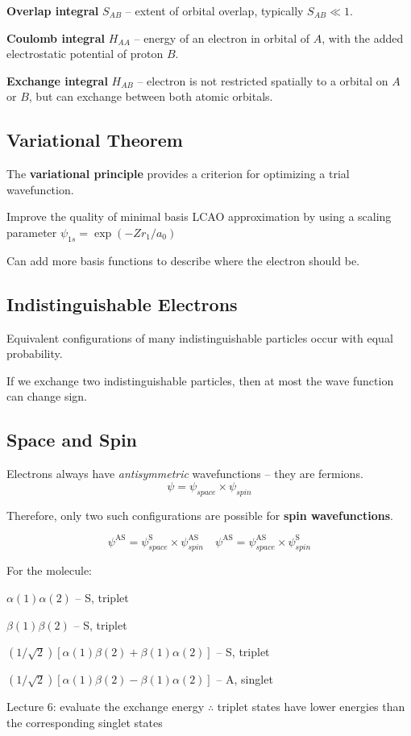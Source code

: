 \textbf{Overlap integral} $S_{AB}$ -- extent of orbital overlap, typically $S_{AB} \ll 1$.

\textbf{Coulomb integral} $H_{AA}$ -- energy of an electron in  orbital of $A$, with the added electrostatic potential of proton $B$.

\textbf{Exchange integral} $H_{AB}$ -- electron is not restricted spatially to a  orbital on $A$ or $B$,
but can exchange between both atomic orbitals.
\vspace{\baselineskip}

\subsection*{Variational Theorem}
The \textbf{variational principle} provides a criterion for optimizing a trial wavefunction.

Improve the quality of minimal basis LCAO approximation by using a scaling parameter $\psi_{1s} = \exp (-Zr_1/a_0)$

Can add more basis functions to describe where the electron should be.

\subsection*{Indistinguishable Electrons}
Equivalent configurations of many indistinguishable particles occur with equal probability.

If we exchange two indistinguishable particles, then at most the
wave function can change sign. 

\subsection*{Space and Spin}
Electrons always have \textit{antisymmetric} wavefunctions -- they are fermions.
$$\psi = \psi_{space} \times \psi_{spin}$$

Therefore, only two such configurations are possible for \textbf{spin wavefunctions}.

$$ \psi^{\mathrm{AS}} = \psi_{space}^{\mathrm{S}} \times \psi_{spin}^{\mathrm{AS}} \quad \psi^{\mathrm{AS}} = \psi_{space}^{\mathrm{AS}} \times \psi_{spin}^{\mathrm{S}} $$

For the  molecule:

$\alpha(1)\alpha(2)$ -- S, triplet

$\beta(1)\beta(2)$ -- S, triplet

$(1/\sqrt{2})[\alpha(1)\beta(2)+\beta(1)\alpha(2)]$ -- S, triplet

$(1/\sqrt{2})[\alpha(1)\beta(2)-\beta(1)\alpha(2)]$ -- A, singlet

Lecture 6: evaluate the exchange energy $\therefore$ triplet states have lower energies than the corresponding singlet states